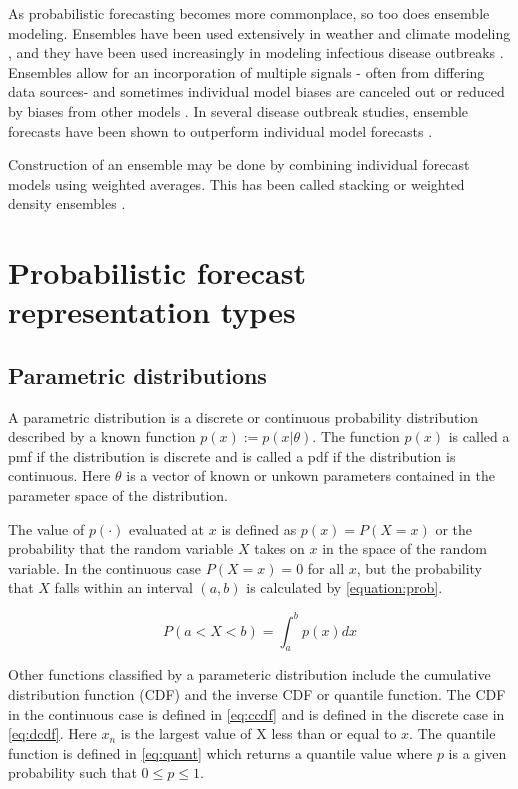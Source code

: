 \documentclass[11pt,notitlepage]{isuthesis}
\begin{document}
As probabilistic forecasting becomes more commonplace, so too does ensemble 
modeling. Ensembles have been used extensively in weather and
climate modeling \cite{baran2018combining}, 
and they have been used increasingly in modeling infectious disease outbreaks
\cite{yamana2016superensemble}. 
Ensembles allow for an incorporation of multiple signals -
often from differing data sources- and sometimes individual model biases are 
canceled
out or reduced by biases from other models \cite[see references
therein]{reich2019accuracy}. 
In several disease outbreak studies, ensemble forecasts have been 
shown to outperform individual model forecasts 
\cite[see
references therein]{cramer2021evaluation}.

Construction of an ensemble may be done by combining individual forecast 
models using weighted averages. This has been called stacking 
\cite{wolpert1992stacked} or weighted density ensembles 
\cite{ray2018prediction}. 

\section{Probabilistic forecast representation types}
\subsection{Parametric distributions}
\label{section:pardist}
A parametric distribution is a discrete or continuous probability distribution 
described by a known function $p(x) := p(x|\theta)$. The function $p(x)$ is 
called a pmf if the distribution is discrete and is called a
pdf if the distribution is continuous. Here $\theta$ is a vector of known or 
unkown parameters contained in the parameter space of the distribution. 

The value of $p(\cdot)$ evaluated at $x$ is defined as 
$p(x) = P(X = x)$ or the probability that the random variable $X$ takes
on $x$ in the space of the random variable. In the continuous case 
$P(X = x) = 0$ for all $x$, but the probability 
that $X$ falls within an interval $(a,b)$ is calculated by 
\eqref{equation:prob}.

\begin{equation}
\label{equation:prob}
  P(a < X < b) = \int_a^b p(x) dx
\end{equation}

Other functions classified by a parameteric distribution include the cumulative
distribution function (CDF) and the inverse CDF or quantile function. The CDF 
in the continuous case is defined in \eqref{eq:ccdf} and is defined in the 
discrete case in \eqref{eq:dcdf}. Here $x_n$ is the largest value of X less than 
or equal to $x$.
The quantile function is defined in \eqref{eq:quant} which returns a quantile 
value where $p$ is a given probability such that $0\leq p \leq 1$.
\end{document}
